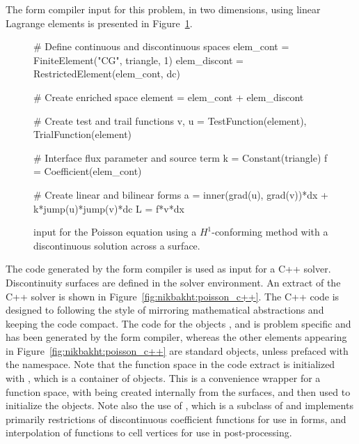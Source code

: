 The form compiler input for this problem, in two dimensions, using linear
Lagrange elements is presented in Figure~\ref{code:nikbakht:Poisson}.
%
\begin{figure}
\begin{python}
# Define continuous and discontinuous spaces
elem_cont    = FiniteElement("CG", triangle, 1)
elem_discont = RestrictedElement(elem_cont, dc)

# Create enriched space
element = elem_cont + elem_discont

# Create test and trail functions
v, u = TestFunction(element), TrialFunction(element)

# Interface flux parameter and source term
k = Constant(triangle)
f = Coefficient(elem_cont)

# Create linear and bilinear forms
a = inner(grad(u), grad(v))*dx + k*jump(u)*jump(v)*dc
L = f*v*dx
\end{python}
\caption{{\ufl} input for the Poisson equation using a $H^{1}$-conforming
method with a discontinuous solution across a surface.}
\label{code:nikbakht:Poisson}
\end{figure}
The code generated by the form compiler is used as input for a C++
solver. Discontinuity surfaces are defined in the solver environment.
An extract of the C++ solver is shown in
Figure~\ref{fig:nikbakht:poisson_c++}.  The C++ code is designed to
following the {\dolfin} style of mirroring mathematical abstractions
and keeping the code compact.  The code for the objects
,  and
 is problem specific and has been generated
by the form compiler, whereas the other elements appearing in
Figure~\ref{fig:nikbakht:poisson_c++} are standard {\dolfin} objects,
unless prefaced with the  namespace. Note that the function
space in the code extract is initialized with , which is
a container of  objects. This is a convenience
wrapper for a \ufc{} function space, with  being
created internally from the surfaces, and then used to initialize the
\ufc{} objects.  Note also the use of , which is a
subclass of  and implements primarily
restrictions of discontinuous coefficient functions for use in forms,
and interpolation of functions to cell vertices for use in
post-processing.
%
